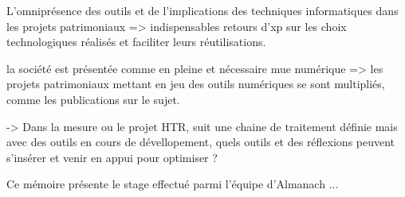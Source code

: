 

% 

L'omniprésence des outils et de l'implications des techniques informatiques dans les projets patrimoniaux => indispensables retours d'xp sur les choix technologiques réalisés et faciliter leurs réutilisations.

la société est présentée comme en pleine et nécessaire mue numérique => les projets patrimoniaux mettant en jeu des outils numériques se sont multipliés, comme les publications sur le sujet.




-> Dans la mesure ou le projet HTR, suit une chaine de traitement définie mais avec des outils en cours de dévellopement, quels outils et des réflexions peuvent s'insérer et venir en appui pour optimiser ? 


Ce mémoire présente le stage effectué parmi l'équipe d'Almanach ... 
